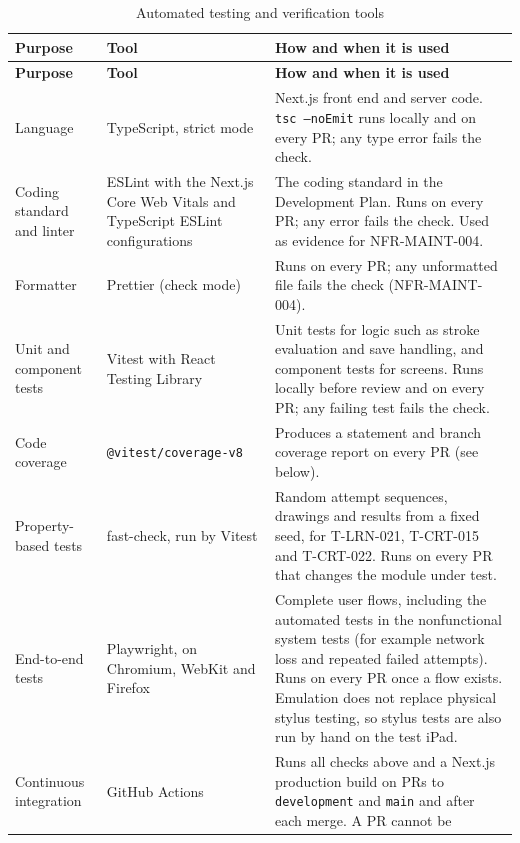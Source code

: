 \documentclass[12pt, titlepage]{article}
\begin{document}
{\small
\begin{longtable}{@{}>{\raggedright\arraybackslash}p{}>{\raggedright\arraybackslash}p{}>{\raggedright\arraybackslash}p{}@{}}
\caption{Automated testing and verification tools}
\label{tab:tools}\\
\toprule
\textbf{Purpose} & \textbf{Tool} & \textbf{How and when it is used}\\
\midrule
\endfirsthead
\toprule
\textbf{Purpose} & \textbf{Tool} & \textbf{How and when it is used}\\
\midrule
\endhead
Language & TypeScript, strict mode & Next.js front end and server
code. \texttt{tsc --noEmit} runs locally and on every PR; any type error
fails the check.\\
\addlinespace
Coding standard and linter & ESLint with the Next.js Core Web Vitals and
TypeScript ESLint configurations & The coding standard in the Development
Plan. Runs on every PR; any error fails the check. Used as evidence for
NFR-MAINT-004.\\
\addlinespace
Formatter & Prettier (check mode) & Runs on every PR; any unformatted file
fails the check (NFR-MAINT-004).\\
\addlinespace
Unit and component tests & Vitest with React Testing Library & Unit tests
for logic such as stroke evaluation and save handling, and component tests
for screens. Runs locally before review and on every PR; any failing test
fails the check.\\
\addlinespace
Code coverage & \texttt{@vitest/\allowbreak coverage-v8} & Produces a statement and
branch coverage report on every PR (see below).\\
\addlinespace
Property-based tests & fast-check, run by Vitest & Random attempt sequences,
drawings and results from a fixed seed, for T-LRN-021, T-CRT-015 and
T-CRT-022. Runs on every PR that changes the module under test.\\
\addlinespace
End-to-end tests & Playwright, on Chromium, WebKit and Firefox & Complete
user flows, including the automated tests in the nonfunctional system tests
(for example network loss and repeated failed attempts). Runs on every PR
once a flow exists. Emulation does not replace physical stylus testing, so
stylus tests are also run by hand on the test iPad.\\
\addlinespace
Continuous integration & GitHub Actions & Runs all checks above and a Next.js
production build on PRs to \texttt{development} and \texttt{main} and after
each merge. A PR cannot be

\end{longtable}}
\end{document}
